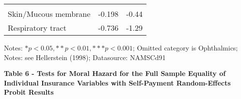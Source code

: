 \documentclass[
]{book}
\begin{document}
\begin{longtable}[]{@{}lll@{}}
\begin{minipage}[t]{0.30\columnwidth}
\end{minipage}\tabularnewline
\begin{minipage}[t]{0.31\columnwidth}\raggedright
Skin/Mucous membrane\strut
\end{minipage} & \begin{minipage}[t]{0.30\columnwidth}\raggedright
-0.198\strut
\end{minipage} & \begin{minipage}[t]{0.30\columnwidth}\raggedright
-0.44\strut
\end{minipage}\tabularnewline
\begin{minipage}[t]{0.31\columnwidth}\raggedright
Respiratory tract\strut
\end{minipage} & \begin{minipage}[t]{0.30\columnwidth}\raggedright
-0.736\strut
\end{minipage} & \begin{minipage}[t]{0.30\columnwidth}\raggedright
-1.29\strut
\end{minipage}\tabularnewline
\bottomrule
\end{longtable}

Notes: \(*p < 0.05, **p < 0.01, ***p < 0.001\); Omitted category is
Ophthalmics; Notes: see Hellerstein (1998); Datasource: NAMSCd91

\textbf{Table 6 - Tests for Moral Hazard for the Full Sample Equality of
Individual Insurance Variables with Self-Payment Random-Effects Probit
Results}
\end{document}
